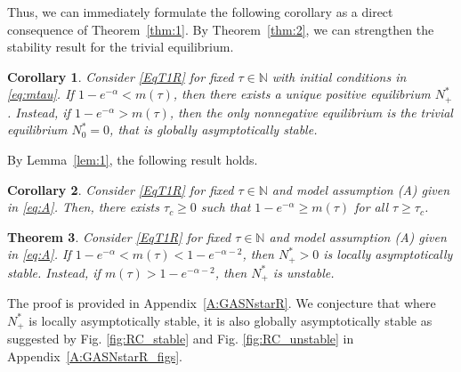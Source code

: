 \documentclass{article}
\newtheorem{theorem}{Theorem}
\numberwithin{theorem}{section}
\newtheorem{corollary}[theorem]{Corollary}
\begin{document}
{Thus, we can immediately formulate the following corollary as a direct consequence of Theorem~\ref{thm:1}. By Theorem~\ref{thm:2}, we can strengthen the stability result for the trivial equilibrium.

\begin{corollary}\label{cor:N0GASR}
Consider \eqref{EqT1R} for fixed $\tau\in \mathbb{N}$ with initial conditions in \eqref{eq:mtau}. 
If $1-e^{-\alpha}< m(\tau)$, then there exists a unique positive equilibrium $N^*_+$. Instead, if $1-e^{-\alpha}> m(\tau)$, then the only nonnegative equilibrium is the trivial equilibrium $N^*_0=0$, that is globally asymptotically stable.
\end{corollary}

By Lemma~\ref{lem:1}, the following result holds. 
\begin{corollary}
    Consider \eqref{EqT1R} for fixed $\tau\in \mathbb{N}$ and model assumption (A) given in \eqref{eq:A}. Then, there exists $\tau_c\geq 0$ such that $1-e^{-\alpha}\geq m(\tau)$ for all $\tau\geq \tau_c$. 
\end{corollary}

\begin{theorem}\label{thm:GASNstar}
     Consider \eqref{EqT1R} for fixed $\tau\in \mathbb{N}$ and model assumption (A) given in \eqref{eq:A}. If $1-e^{-\alpha}< m(\tau)<1-e^{-\alpha-2}$, then $N^*_+>0$ is locally asymptotically stable. Instead, if $m(\tau)>1-e^{-\alpha-2}$, then $N^*_+$ is unstable.
\end{theorem}

The proof is provided in Appendix~\ref{A:GASNstarR}. We conjecture that where $N^*_+$ is locally asymptotically stable, it is also globally asymptotically stable as suggested by Fig. \ref{fig:RC_stable} and Fig. \ref{fig:RC_unstable} in Appendix~\ref{A:GASNstarR_figs}.

}
\end{document}
